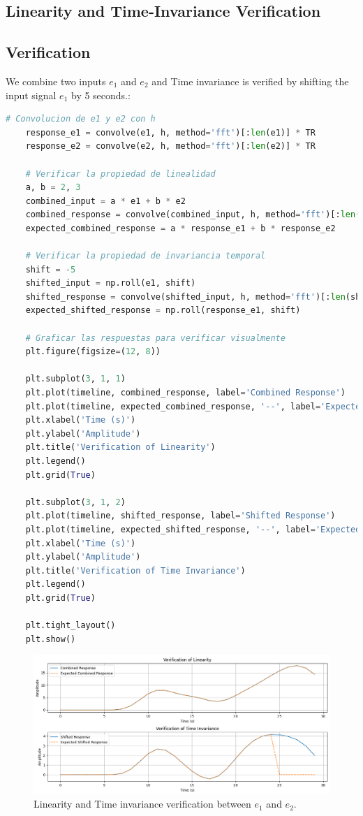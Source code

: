\documentclass[10pt]{article}
\theoremstyle{definition}
\theoremstyle{remark}
\theoremstyle{definition}
\numberwithin{equation}{prob}
\begin{document}
\subsection{Linearity and Time-Invariance Verification}

\subsection*{Verification}
We combine two inputs $e_1$ and $e_2$ and Time invariance is verified by shifting the input signal $e_1$ by 5 seconds.:

\begin{lstlisting}[language=Python]
    # Convolucion de e1 y e2 con h
    response_e1 = convolve(e1, h, method='fft')[:len(e1)] * TR
    response_e2 = convolve(e2, h, method='fft')[:len(e2)] * TR
    
    # Verificar la propiedad de linealidad
    a, b = 2, 3
    combined_input = a * e1 + b * e2
    combined_response = convolve(combined_input, h, method='fft')[:len(combined_input)] * TR
    expected_combined_response = a * response_e1 + b * response_e2
    
    # Verificar la propiedad de invariancia temporal
    shift = -5
    shifted_input = np.roll(e1, shift)
    shifted_response = convolve(shifted_input, h, method='fft')[:len(shifted_input)] * TR
    expected_shifted_response = np.roll(response_e1, shift)
    
    # Graficar las respuestas para verificar visualmente
    plt.figure(figsize=(12, 8))
    
    plt.subplot(3, 1, 1)
    plt.plot(timeline, combined_response, label='Combined Response')
    plt.plot(timeline, expected_combined_response, '--', label='Expected Combined Response')
    plt.xlabel('Time (s)')
    plt.ylabel('Amplitude')
    plt.title('Verification of Linearity')
    plt.legend()
    plt.grid(True)
    
    plt.subplot(3, 1, 2)
    plt.plot(timeline, shifted_response, label='Shifted Response')
    plt.plot(timeline, expected_shifted_response, '--', label='Expected Shifted Response')
    plt.xlabel('Time (s)')
    plt.ylabel('Amplitude')
    plt.title('Verification of Time Invariance')
    plt.legend()
    plt.grid(True)
    
    plt.tight_layout()
    plt.show()
\end{lstlisting}

\begin{figure}[H]
    \centering
    \includegraphics[width=0.8\linewidth]{./figures/Response Verification Inputs e1 and e2.png}
    \caption{Linearity and Time invariance verification between $e_1$ and $e_2$.}
\end{figure}
\end{document}
